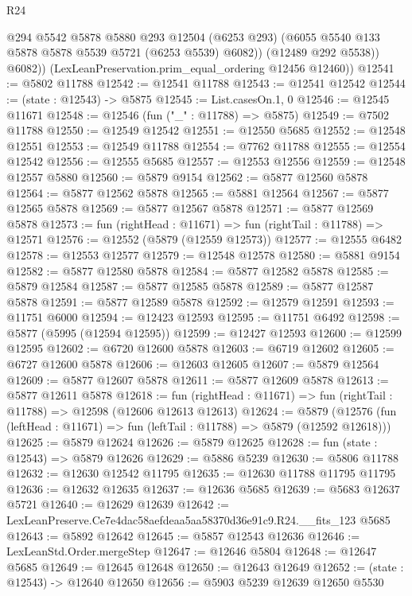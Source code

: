 \begin{lexlean}{R24}
\begin{coremodule}
              @294
              @5542
              @5878
              @5880
              @293
              @12504
              (@6253 @293)
              (@6055 @5540 @133 @5878 @5878 @5539 @5721 (@6253 @5539) @6082))
            (@12489 @292 @5538))
          @6082))
      (LexLeanPreservation.prim_equal_ordering @12456 @12460))
@12541 := @5802 @11788
@12542 := @12541 @11788
@12543 := @12541 @12542
@12544 := (state : @12543) -> @5875
@12545 := List.casesOn.{1, 0}
@12546 := @12545 @11671
@12548 := @12546 (fun ("_" : @11788) => @5875)
@12549 := @7502 @11788
@12550 := @12549 @12542
@12551 := @12550 @5685
@12552 := @12548 @12551
@12553 := @12549 @11788
@12554 := @7762 @11788
@12555 := @12554 @12542
@12556 := @12555 @5685
@12557 := @12553 @12556
@12559 := @12548 @12557 @5880
@12560 := @5879 @9154
@12562 := @5877 @12560 @5878
@12564 := @5877 @12562 @5878
@12565 := @5881 @12564
@12567 := @5877 @12565 @5878
@12569 := @5877 @12567 @5878
@12571 := @5877 @12569 @5878
@12573 := fun (rightHead : @11671) => fun (rightTail : @11788) => @12571
@12576 := @12552 (@5879 (@12559 @12573))
@12577 := @12555 @6482
@12578 := @12553 @12577
@12579 := @12548 @12578
@12580 := @5881 @9154
@12582 := @5877 @12580 @5878
@12584 := @5877 @12582 @5878
@12585 := @5879 @12584
@12587 := @5877 @12585 @5878
@12589 := @5877 @12587 @5878
@12591 := @5877 @12589 @5878
@12592 := @12579 @12591
@12593 := @11751 @6000
@12594 := @12423 @12593
@12595 := @11751 @6492
@12598 := @5877 (@5995 (@12594 @12595))
@12599 := @12427 @12593
@12600 := @12599 @12595
@12602 := @6720 @12600 @5878
@12603 := @6719 @12602
@12605 := @6727 @12600 @5878
@12606 := @12603 @12605
@12607 := @5879 @12564
@12609 := @5877 @12607 @5878
@12611 := @5877 @12609 @5878
@12613 := @5877 @12611 @5878
@12618 := fun (rightHead : @11671) => fun (rightTail : @11788) => @12598 (@12606 @12613 @12613)
@12624 := @5879
    (@12576 (fun (leftHead : @11671) => fun (leftTail : @11788) => @5879 (@12592 @12618)))
@12625 := @5879 @12624
@12626 := @5879 @12625
@12628 := fun (state : @12543) => @5879 @12626
@12629 := @5886 @5239
@12630 := @5806 @11788
@12632 := @12630 @12542 @11795
@12635 := @12630 @11788 @11795 @11795
@12636 := @12632 @12635
@12637 := @12636 @5685
@12639 := @5683 @12637 @5721
@12640 := @12629 @12639
@12642 := LexLeanPreserve.Ce7e4dac58aefdeaa5aa58370d36e91c9.R24.__fits_123 @5685
@12643 := @5892 @12642
@12645 := @5857 @12543 @12636
@12646 := LexLeanStd.Order.mergeStep
@12647 := @12646 @5804
@12648 := @12647 @5685
@12649 := @12645 @12648
@12650 := @12643 @12649
@12652 := (state : @12543) -> @12640 @12650
@12656 := @5903 @5239 @12639 @12650 @5530

\end{coremodule}
\end{lexlean}
